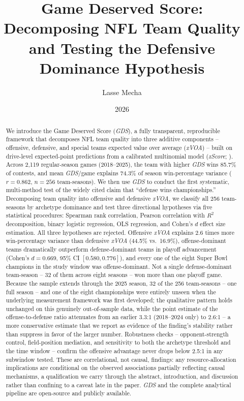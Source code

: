 \documentclass[12pt,a4paper]{article}
\title{Game Deserved Score: Decomposing NFL Team Quality\\and Testing the Defensive Dominance Hypothesis}
\author{Lasse Mecha}
\date{2026}
\newcommand{\xscore}{\textit{xScore}}
\newcommand{\xvoa}{\textit{xVOA}}
\newcommand{\gds}{\textit{GDS}}
\begin{document}
\maketitle

\begin{abstract}
We introduce the Game Deserved Score (\gds{}), a fully transparent, reproducible framework that decomposes NFL team quality into three additive components -- offensive, defensive, and special teams expected value over average (\xvoa{}) -- built on drive-level expected-point predictions from a calibrated multinomial model (\xscore{}; \citealt{mecha2026xscore-model}). Across 2,119 regular-season games (2018--2025), the team with higher \gds{} wins 85.7\% of contests, and mean \gds{}/game explains 74.3\% of season win-percentage variance ($r = 0.862$, $n = 256$ team-seasons). We then use \gds{} to conduct the first systematic, multi-method test of the widely cited claim that ``defense wins championships.'' Decomposing team quality into offensive and defensive \xvoa{}, we classify all 256 team-seasons by archetype dominance and test three directional hypotheses via five statistical procedures: Spearman rank correlation, Pearson correlation with $R^2$ decomposition, binary logistic regression, OLS regression, and Cohen's $d$ effect size estimation. All three hypotheses are rejected. Offensive \xvoa{} explains 2.6 times more win-percentage variance than defensive \xvoa{} (44.5\% vs.\ 16.9\%), offense-dominant teams dramatically outperform defense-dominant teams in playoff advancement (Cohen's $d = 0.669$, 95\% CI $[0.580, 0.776]$), and every one of the eight Super Bowl champions in the study window was offense-dominant. Not a single defense-dominant team-season -- 32 of them across eight seasons -- won more than one playoff game. Because the sample extends through the 2025 season, 32 of the 256 team-seasons -- one full season -- and one of the eight championships were entirely unseen when the underlying measurement framework was first developed; the qualitative pattern holds unchanged on this genuinely out-of-sample data, while the point estimate of the offense-to-defense ratio attenuates from an earlier 3.3:1 (2018--2024 only) to 2.6:1 -- a more conservative estimate that we report as evidence of the finding's stability rather than suppress in favor of the larger number. Robustness checks -- opponent-strength control, field-position mediation, and sensitivity to both the archetype threshold and the time window -- confirm the offensive advantage never drops below 2.5:1 in any subwindow tested. These are correlational, not causal, findings: any resource-allocation implications are conditional on the observed associations partially reflecting causal mechanisms, a qualification we carry through the abstract, introduction, and discussion rather than confining to a caveat late in the paper. \gds{} and the complete analytical pipeline are open-source and publicly available.
\end{abstract}
\end{document}
